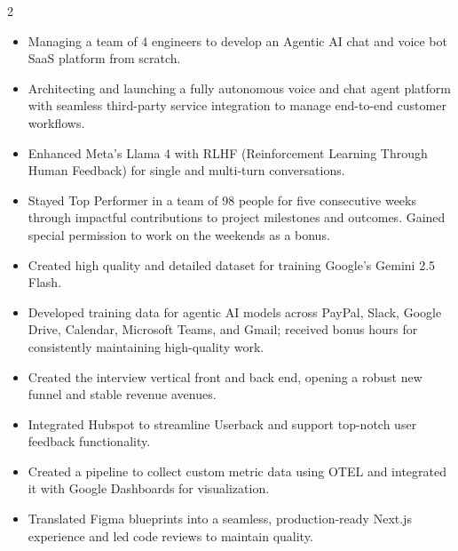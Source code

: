 \documentclass[10pt,a4paper,ragged2e,withhyper]{altacv}
\begin{document}
\begin{paracol}{2}


\begin{itemize}
    \item Managing a team of 4 engineers to develop an Agentic AI chat and voice bot SaaS platform from scratch.
    \item Architecting and launching a fully autonomous voice and chat agent platform with seamless third-party service integration to manage end-to-end customer workflows.
\end{itemize}

\divider

\begin{itemize}
    \item Enhanced Meta's Llama 4 with RLHF (Reinforcement Learning Through Human Feedback) for single and multi-turn conversations.
    \item Stayed Top Performer in a team of 98 people for five consecutive weeks through impactful contributions to project milestones and outcomes. Gained special permission to work on the weekends as a bonus.
    \item Created high quality and detailed dataset for training Google's Gemini 2.5 Flash.
    \item Developed training data for agentic AI models across PayPal, Slack, Google Drive, Calendar, Microsoft Teams, and Gmail; received bonus hours for consistently maintaining high-quality work.
\end{itemize}

\divider

\begin{itemize}
    \item Created the interview vertical front and back end, opening a robust new funnel and stable revenue avenues.
    \item Integrated Hubspot to streamline Userback and support top-notch user feedback functionality.
    \item Created a pipeline to collect custom metric data using OTEL and integrated it with Google Dashboards for visualization.
    \item Translated Figma blueprints into a seamless, production-ready Next.js experience and led code reviews to maintain quality.
\end{itemize}


\end{paracol}
\end{document}
